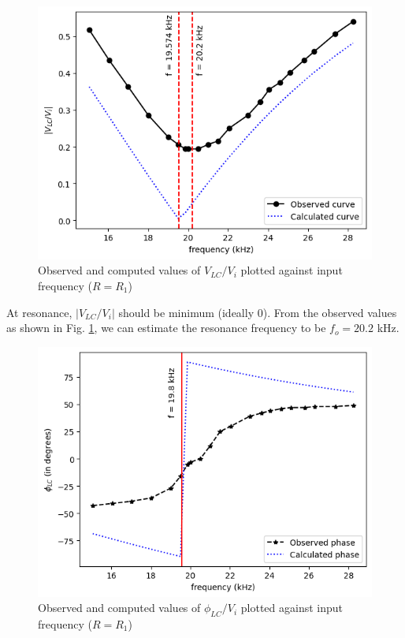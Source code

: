         \begin{figure}[H]
            \centering
            \includegraphics[width=1\columnwidth]{images/g4.png}
            \caption{Observed and computed values of $V_{LC}/V_i$ plotted against input frequency ($R=R_1$)}
            \label{graph:3}
        \end{figure}

        At resonance, $|V_{LC}/V_i|$ should be minimum (ideally 0). From the observed values as shown in Fig. \ref{graph:3}, we can estimate the resonance frequency to be $f_o=20.2$ kHz.

        \begin{figure}[H]
            \centering
            \includegraphics[width=1\columnwidth]{images/g5.png}
            \caption{Observed and computed values of $\phi_{LC}/V_i$ plotted against input frequency ($R=R_1$)}
            \label{graph:4}
        \end{figure}

